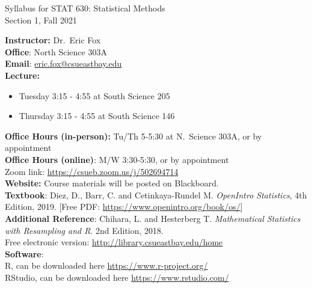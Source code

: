 \documentclass[12pt]{report}
\newenvironment{myitemize}
{ \begin{itemize}
    \setlength{\itemsep}{5pt}
    \setlength{\parskip}{0pt}
    \setlength{\parsep}{0pt}     }
{ \end{itemize}                  }
\begin{document}
\setlength\parindent{0pt}

\begin{center}
\Large
Syllabus for STAT 630: Statistical Methods\\
\large
Section 1, Fall 2021\\   
\end{center}
\vspace{5pt}

\normalsize
\textbf{Instructor:} Dr.~Eric Fox\\ 
\textbf{Office}: North Science 303A\\ 
\textbf{Email}: \url{eric.fox@csueastbay.edu}\\

\textbf{Lecture:}
\begin{myitemize}
\item Tuesday 3:15 - 4:55 at South Science 205
\item Thursday 3:15 - 4:55 at South Science 146\\
\end{myitemize}

\textbf{Office Hours (in-person):} Tu/Th 5-5:30 at N.~Science 303A, or by appointment\\

\textbf{Office Hours (online)}: M/W 3:30-5:30, or by appointment\\
Zoom link: \url{https://csueb.zoom.us/j/502694714}\\

\textbf{Website:} Course materials will be posted on Blackboard.\\ 

\textbf{Textbook}:  Diez, D., Barr, C. and Cetinkaya-Rundel M. \emph{OpenIntro Statistics}, 4th Edition, 2019. [Free PDF: \url{https://www.openintro.org/book/os/}]\\ 

\textbf{Additional Reference}: Chihara, L. and Hesterberg T. \emph{Mathematical Statistics with Resampling and R}. 2nd Edition, 2018.\\ 
Free electronic version: \url{http://library.csueastbay.edu/home}\\

\textbf{Software}:\\ 
R, can be downloaded here \url{https://www.r-project.org/}\\
RStudio, can be downloaded here \url{https://www.rstudio.com/}\\ 
\end{document}
